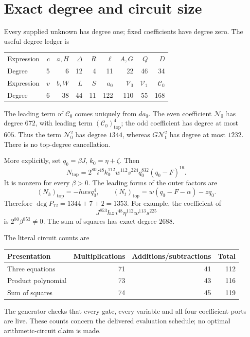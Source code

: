 \documentclass[11pt]{article}
\theoremstyle{remark}\newtheorem{remark}[theorem]{Remark}
\newcommand{\topdeg}{\mathrm{top}}
\begin{document}
\section{Exact degree and circuit size}\label{sec:degree}

Every supplied unknown has degree one; fixed coefficients have
degree zero. The useful degree ledger is
\begin{center}
\begin{tabular}{lrrrrrrrr}
\toprule
Expression & \(c\) & \(a,H\) & \(\Delta\) & \(R\) & \(\ell\) & \(A,G\) & \(Q\) & \(D\)\\
Degree & 5 & 6 & 12 & 4 & 11 & 22 & 46 & 34\\
\midrule
Expression & \(v\) & \(b,W\) & \(L\) & \(S\) & \(a_0\) & \(\mathcal V_0\) & \(\mathcal V_1\) & \(\mathcal C_0\)\\
Degree & 6 & 38 & 44 & 11 & 122 & 110 & 55 & 168\\
\bottomrule
\end{tabular}
\end{center}
The leading term of \(\mathcal C_0\) comes uniquely from \(da_0\).
The even coefficient \(\mathcal N_0\) has degree \(672\), with
leading term \((\mathcal C_0)_{\topdeg}^4\); the odd coefficient
has degree at most \(605\). Thus the term
\(\mathcal N_0^2\) has degree \(1344\), whereas
\(G\mathcal N_1^2\) has degree at most \(1232\).
There is no top-degree cancellation.

More explicitly, set \(q_0=\beta J\), \(k_0=\eta+\zeta\). Then
\begin{equation}\label{eq:Ntop}
 N_{\topdeg}
  =2^{80}i^{48}k_0^{112}w^{112}s^{224}
             q_0^{832}(q_0-F)^{16}.
\end{equation}
It is nonzero for every \(\beta>0\).
The leading forms of the outer factors are
\[
 (N_k)_{\topdeg}=-hwsq_0^4,\qquad
 (N_t)_{\topdeg}=w(q_0-F-\alpha)-zq_0.
\]
Therefore \(\deg P_{12}=1344+7+2=1353\).
For example, the coefficient of
\[
 J^{853}hz\,i^{48}\eta^{112}w^{113}s^{225}
\]
is \(2^{80}\beta^{853}\ne0\). The sum of squares has exact
degree \(2688\).

The literal circuit counts are
\begin{center}
\begin{tabular}{lrrr}
\toprule
Presentation & Multiplications & Additions/subtractions & Total\\
\midrule
Three equations & 71 & 41 & 112\\
Product polynomial & 73 & 43 & 116\\
Sum of squares & 74 & 45 & 119\\
\bottomrule
\end{tabular}
\end{center}
The generator checks that every gate, every variable and all four
coefficient ports are live. These counts concern the delivered
evaluation schedule; no optimal arithmetic-circuit claim is made.
\end{document}

